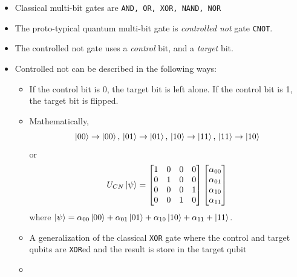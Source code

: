 \documentclass{article}
\begin{document}
            \begin{itemize}
                \item Classical multi-bit gates are \verb|AND, OR, XOR, NAND, NOR|
                \item The proto-typical quantum multi-bit gate is \emph{controlled not} gate \verb|CNOT|.
                \item The controlled not gate uses a \emph{control} bit, and a \emph{target} bit.
                \item Controlled not can be described in the following ways:
                    \begin{itemize}
                        \item If the control bit is 0, the target bit is left alone.  If the control bit is 1, the target bit is flipped.
                        \item Mathematically, 
                        \begin{equation}
                            \ket{00} \to \ket{00},\, \ket{01} \to \ket{01},\, \ket{10} \to \ket{11},\, \ket{11} \to \ket{10}
                        \end{equation}
                        or
                        \begin{equation}
                            U_{CN} \ket{\psi} = \begin{bmatrix}
                                1 & 0 & 0 & 0 \\
                                0 & 1 & 0 & 0 \\
                                0 & 0 & 0 & 1 \\
                                0 & 0 & 1 & 0
                            \end{bmatrix}
                            \begin{bmatrix}
                                \alpha_{00} \\
                                \alpha_{01} \\
                                \alpha_{10} \\
                                \alpha_{11}
                            \end{bmatrix}
                        \end{equation}
                        where $\ket{\psi} = \alpha_{00} \ket{00} + \alpha_{01} \ket{01} + \alpha_{10} \ket{10} + \alpha_{11} + \ket{11}$.
                        \item A generalization of the classical \verb|XOR| gate where the control and target qubits are \verb|XOR|ed and the result is store in the target qubit
                        \item 
                    \end{itemize}
            \end{itemize}
\end{document}
